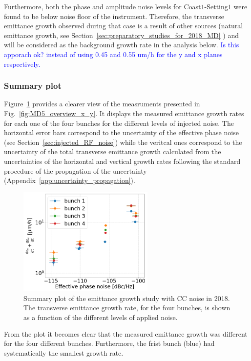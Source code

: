 Furthermore, both the phase and amplitude noise levels for Coast$1$-Setting$1$ were found to be below noise floor of the instrument. Therefore, the transverse emittance growth observed during that case is a result of other sources (natural emittance growth, see Section~\ref{sec:preparatory_studies_for_2018_MD} ) and will be considered as the background growth rate in the analysis below. \textcolor{blue}{Is this apporach ok? instead of using 0.45 and 0.55 um/h for the y and x planes respectively.}

\subsubsection*{Summary plot}
Figure~\ref{fig:MD5_summary_plot} provides a clearer view of the measruments presented in Fig.~\ref{fig:MD5_overview_x_y}. It displays the measured emittance growth rates for each one of the four bunches for the different levels of injected noise. The horizontal error bars correspond to the uncertainty of the effective phase noise (see Section~\ref{sec:injected_RF_noise}) while the veritcal ones correspond to the uncertainty of the total transverse emittance growth calculated from the uncertainties of the horizontal and vertical growth rates following the standard procedure of the propagation of the uncertainty (Appendix~\ref{app:uncertainty_propagation}).

\begin{figure}[!h]
   \centering         
   \includegraphics[width=0.6\textwidth]{images/Ch5/MD5_summary_plot_no_backg_subtraction.png}
       \caption{Summary plot of the emittance growth study with CC noise in 2018. The transverse emittance growth rate, for the four bunches, is shown as a function of the different levels of applied noise.}
       \label{fig:MD5_summary_plot}
\end{figure}

From the plot it becomes clear that the measured emittance growth was different for the four different bunches. Furthermore, the frist bunch (blue) had systematically the smallest growth rate.

